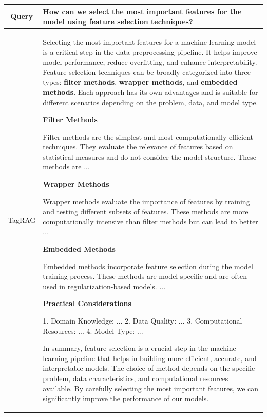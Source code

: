 \documentclass[11pt]{article}
\begin{document}
\begin{table}[h]
\small
\begin{tabularx}{\textwidth}{p{2cm}|X}
    \toprule
    \multicolumn{1}{c|}{Query} & How can we select the most important features for the model using feature selection techniques? \\
    
    \hline
    
    \multicolumn{1}{c|}{TagRAG} & Selecting the most important features for a machine learning model is a critical step in the data preprocessing pipeline. It helps improve model performance, reduce overfitting, and enhance interpretability. Feature selection techniques can be broadly categorized into three types: \textbf{filter methods}, \textbf{wrapper methods}, and \textbf{embedded methods}. Each approach has its own advantages and is suitable for different scenarios depending on the problem, data, and model type. 
    
    \textbf{Filter Methods}

    Filter methods are the simplest and most computationally efficient techniques. They evaluate the relevance of features based on statistical measures and do not consider the model structure. These methods are ...
    
    \textbf{Wrapper Methods}
    
    Wrapper methods evaluate the importance of features by training and testing different subsets of features. These methods are more computationally intensive than filter methods but can lead to better ...
    
    \textbf{Embedded Methods}
    
    Embedded methods incorporate feature selection during the model training process. These methods are model-specific and are often used in regularization-based models. ...
    
    \textbf{Practical Considerations}
    
    1. Domain Knowledge: ... 2. Data Quality: ... 3. Computational Resources: ... 4. Model Type: ...
    
    In summary, feature selection is a crucial step in the machine learning pipeline that helps in building more efficient, accurate, and interpretable models. The choice of method depends on the specific problem, data characteristics, and computational resources available. By carefully selecting the most important features, we can significantly improve the performance of our models. \\
    

\end{tabularx}
\end{table}
\end{document}
